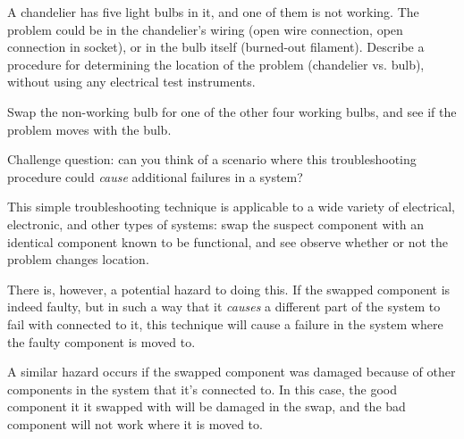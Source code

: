 

A chandelier has five light bulbs in it, and one of them is not working.  The problem could be in the chandelier's wiring (open wire connection, open connection in socket), or in the bulb itself (burned-out filament).  Describe a procedure for determining the location of the problem (chandelier vs. bulb), without using any electrical test instruments.







Swap the non-working bulb for one of the other four working bulbs, and see if the problem moves with the bulb.

\vskip 10pt

Challenge question: can you think of a scenario where this troubleshooting procedure could {\it cause} additional failures in a system?







This simple troubleshooting technique is applicable to a wide variety of electrical, electronic, and other types of systems: swap the suspect component with an identical component known to be functional, and see observe whether or not the problem changes location.

There is, however, a potential hazard to doing this.  If the swapped component is indeed faulty, but in such a way that it {\it causes} a different part of the system to fail with connected to it, this technique will cause a failure in the system where the faulty component is moved to.

A similar hazard occurs if the swapped component was damaged because of other components in the system that it's connected to.  In this case, the good component it it swapped with will be damaged in the swap, and the bad component will not work where it is moved to.




